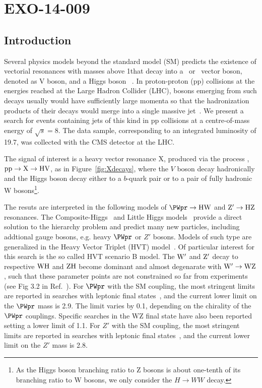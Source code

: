 \chapter{EXO-14-009}
\section{Introduction}
\label{sec:introduction}

Several physics models beyond the standard model (SM) predicts the
existence of vectorial  resonances with
masses above 1\TeVcc that decay into
a \PW\ or \cPZ\ vector boson, denoted as V boson,
  and a Higgs boson~\cite{Chatrchyan:2012ufa,higgsdiscoveryAtlas} .
In
proton-proton (pp) collisions at the energies reached at the Large Hadron
Collider (LHC), bosons emerging from such decays usually would have
sufficiently large momenta so that the hadronization products of their
 decays would merge into a single massive
jet~\cite{Gouzevitch:2013qca}. We present a search for events
containing jets of this kind in pp collisions at a
centre-of-mass energy of $\sqrt{s}=8$\TeVcc.  The data sample,
corresponding to an integrated luminosity of 19.7\fbinv, was collected
with the CMS detector at the LHC.

The signal of interest is a heavy vector resonance X, produced via the process
, ${\rm pp\to X\to H V}$, as in Figure~\ref{fig:Xdecays},  where
 the $V$ boson decay hadronically and the Higgs
 boson decay either to a $b$-quark pair or to
a pair of fully hadronic W bosons\footnote{As the Higgs
 boson branching ratio to Z bosons is about one-tenth of
its branching ratio to W bosons,
 we only consider the $H\to WW$ decay.}.

The resuts are interpreted in the following models of ${\rm \PWpr\to HW}$ and ${\rm Z'\to HZ}$ resonances.
The Composite-Higgs~\cite{Composite0,Composite1,Composite2} and Little Higgs models~\cite{Han:2003wu}
provide a direct solution to the hierarchy problem and predict many new particles,
including addtional gauge bosons, e.g. heavy $\PWpr$ or $Z'$ bosons.
Models of such type are generalized in the Heavy Vector Triplet (HVT) model~\cite{Pappadopulo:2014qza}.
Of particular interest for this search is the so called HVT scenario B model.
The
${\rm W^\prime}$ and ${\rm Z^\prime}$ decay to respective ${\rm WH}$ and ${\rm ZH}$ become dominant and almost degenarate
 with ${\rm W^\prime \rightarrow WZ}$,
such that these parameter points are not
 constrained so far from experiments (see Fig 3.2 in Ref.~\cite{Pappadopulo:2014qza}).
For $\PWpr$ with the SM coupling, the most stringent limits are reported in searches with
leptonic final states~\cite{CMSwprimePAPER2013,ATLASwprimePAPER}, and the current lower
limit on the $\PWpr$ mass is 2.9\TeVcc.
The limit varies by 0.1\TeVcc, depending on the chirality of the $\PWpr$ couplings.
Specific searches in the WZ final state have also 
been reported~\cite{CMSwprimeWZPAS,ATLASWWPAPER,ATLASwprimeWZPAS}
setting a lower limit of 1.1\TeVcc. 
For $Z'$ with the SM coupling, the most stringent limits are reported in searches with
leptonic final states~\cite{ATLASzprimePAPER,CMSzprimePAPER}, and the current lower
limit on the $Z'$ mass is 2.8\TeVcc.


